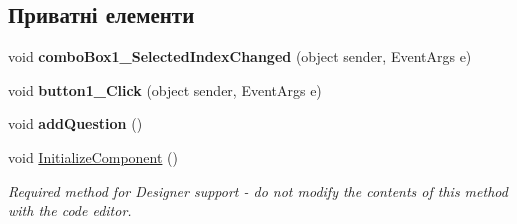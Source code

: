 \subsection*{Приватні елементи}
\begin{DoxyCompactItemize}
\item 
void {\bfseries combo\+Box1\+\_\+\+Selected\+Index\+Changed} (object sender, Event\+Args e)\hypertarget{class_tests_1_1_form2_a6290a2a05345f3a6220f589a3f52f3fa}{}\label{class_tests_1_1_form2_a6290a2a05345f3a6220f589a3f52f3fa}

\item 
void {\bfseries button1\+\_\+\+Click} (object sender, Event\+Args e)\hypertarget{class_tests_1_1_form2_af46cfa9c6945e9e5b25b0e0face3ba4d}{}\label{class_tests_1_1_form2_af46cfa9c6945e9e5b25b0e0face3ba4d}

\item 
void {\bfseries add\+Question} ()\hypertarget{class_tests_1_1_form2_a3d7513211542e9311844b6641eb9fd61}{}\label{class_tests_1_1_form2_a3d7513211542e9311844b6641eb9fd61}

\item 
void \hyperlink{class_tests_1_1_form2_ac597a8f0343f236b4d1ea528528e138c}{Initialize\+Component} ()
\begin{DoxyCompactList}\small\item\em Required method for Designer support -\/ do not modify the contents of this method with the code editor. \end{DoxyCompactList}\end{DoxyCompactItemize}
